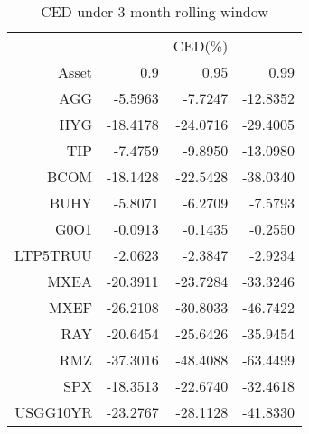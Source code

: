 \documentclass[12pt]{article}
\begin{document}
\begin{table}[!h]
\caption{CED under 3-month rolling window} %
\centering 
\begin{tabular}{ | r || r r r | } 
 \hline
 & & CED(\%) & \\
Asset& 0.9 & 0.95 & 0.99  \\
  \hline \hline
AGG &  -5.5963 &  -7.7247 & -12.8352\\ 
HYG & -18.4178 & -24.0716 & -29.4005\\ 
TIP &  -7.4759 &  -9.8950 & -13.0980\\ 
BCOM & -18.1428 & -22.5428 & -38.0340\\ 
BUHY &  -5.8071 &  -6.2709 &  -7.5793\\ 
G0O1 &  -0.0913 &  -0.1435 &  -0.2550\\ 
LTP5TRUU &  -2.0623 &  -2.3847 &  -2.9234\\ 
MXEA & -20.3911 & -23.7284 & -33.3246\\ 
MXEF & -26.2108 & -30.8033 & -46.7422\\ 
RAY & -20.6454 & -25.6426 & -35.9454\\ 
RMZ & -37.3016 & -48.4088 & -63.4499\\ 
SPX & -18.3513 & -22.6740 & -32.4618\\ 
USGG10YR & -23.2767 & -28.1128 & -41.8330\\
 \hline
\end{tabular}
\label{table:CED3}
\end{table}


%
%
\end{document}
